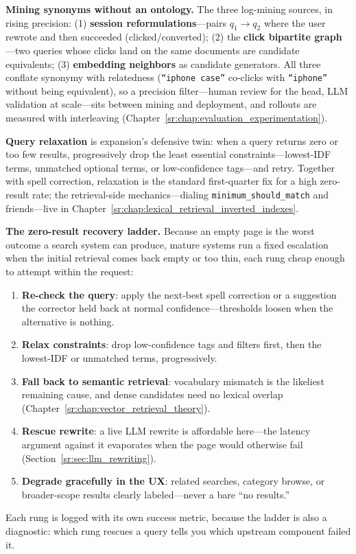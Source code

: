 \textbf{Mining synonyms without an ontology.} The three log-mining sources, in rising precision: (1) \textbf{session reformulations}---pairs $q_1 \to q_2$ where the user rewrote and then succeeded (clicked/converted); (2) the \textbf{click bipartite graph}---two queries whose clicks land on the same documents are candidate equivalents; (3) \textbf{embedding neighbors} as candidate generators. All three conflate synonymy with relatedness (\texttt{``iphone case''} co-clicks with \texttt{``iphone''} without being equivalent), so a precision filter---human review for the head, LLM validation at scale---sits between mining and deployment, and rollouts are measured with interleaving (Chapter~\ref{sr:chap:evaluation_experimentation}).

\textbf{Query relaxation} is expansion's defensive twin: when a query returns zero or too few results, progressively drop the least essential constraints---lowest-IDF terms, unmatched optional terms, or low-confidence tags---and retry. Together with spell correction, relaxation is the standard first-quarter fix for a high zero-result rate; the retrieval-side mechanics---dialing \texttt{minimum\_should\_match} and friends---live in Chapter~\ref{sr:chap:lexical_retrieval_inverted_indexes}.

\textbf{The zero-result recovery ladder.} Because an empty page is the worst outcome a search system can produce, mature systems run a fixed escalation when the initial retrieval comes back empty or too thin, each rung cheap enough to attempt within the request:
\begin{enumerate}
    \item \textbf{Re-check the query}: apply the next-best spell correction or a suggestion the corrector held back at normal confidence---thresholds loosen when the alternative is nothing.
    \item \textbf{Relax constraints}: drop low-confidence tags and filters first, then the lowest-IDF or unmatched terms, progressively.
    \item \textbf{Fall back to semantic retrieval}: vocabulary mismatch is the likeliest remaining cause, and dense candidates need no lexical overlap (Chapter~\ref{sr:chap:vector_retrieval_theory}).
    \item \textbf{Rescue rewrite}: a live LLM rewrite is affordable here---the latency argument against it evaporates when the page would otherwise fail (Section~\ref{sr:sec:llm_rewriting}).
    \item \textbf{Degrade gracefully in the UX}: related searches, category browse, or broader-scope results clearly labeled---never a bare ``no results.''
\end{enumerate}
Each rung is logged with its own success metric, because the ladder is also a diagnostic: which rung rescues a query tells you which upstream component failed it.

